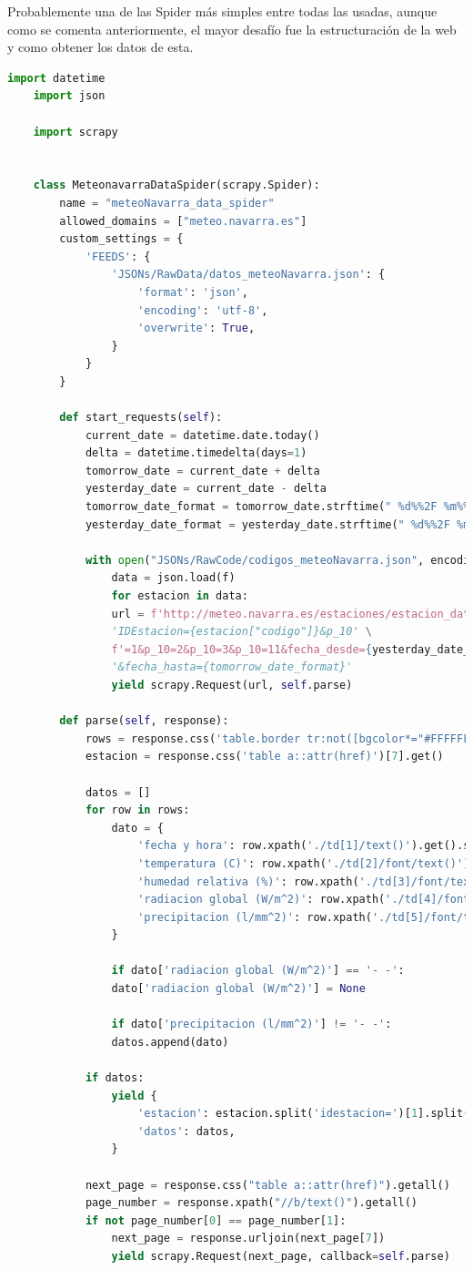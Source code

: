 Probablemente una de las Spider más simples entre todas las usadas, aunque como se comenta anteriormente, el mayor desafío fue la estructuración de la web y como obtener los datos de esta.

\begin{lstlisting}[language=Python, caption={MeteoNavarra Data Spider}]
	import datetime
	import json
	
	import scrapy
	
	
	class MeteonavarraDataSpider(scrapy.Spider):
		name = "meteoNavarra_data_spider"
		allowed_domains = ["meteo.navarra.es"]
		custom_settings = {
			'FEEDS': {
				'JSONs/RawData/datos_meteoNavarra.json': {
					'format': 'json',
					'encoding': 'utf-8',
					'overwrite': True,
				}
			}
		}
		
		def start_requests(self):
			current_date = datetime.date.today()
			delta = datetime.timedelta(days=1)
			tomorrow_date = current_date + delta
			yesterday_date = current_date - delta
			tomorrow_date_format = tomorrow_date.strftime(" %d%%2F %m%%2F%Y").replace(' 0', '')
			yesterday_date_format = yesterday_date.strftime(" %d%%2F %m%%2F%Y").replace(' 0', '')
			
			with open("JSONs/RawCode/codigos_meteoNavarra.json", encoding="utf-8") as f:
				data = json.load(f)
				for estacion in data:
				url = f'http://meteo.navarra.es/estaciones/estacion_datos_m.cfm?'
				'IDEstacion={estacion["codigo"]}&p_10' \
				f'=1&p_10=2&p_10=3&p_10=11&fecha_desde={yesterday_date_format}'
				'&fecha_hasta={tomorrow_date_format}'
				yield scrapy.Request(url, self.parse)
		
		def parse(self, response):
			rows = response.css('table.border tr:not([bgcolor*="#FFFFFF"])')
			estacion = response.css('table a::attr(href)')[7].get()
			
			datos = []
			for row in rows:
				dato = {
					'fecha y hora': row.xpath('./td[1]/text()').get().strip().replace(' ', ' ') + ':00',
					'temperatura (C)': row.xpath('./td[2]/font/text()').get(),
					'humedad relativa (%)': row.xpath('./td[3]/font/text()').get(),
					'radiacion global (W/m^2)': row.xpath('./td[4]/font/text()').get(),
					'precipitacion (l/mm^2)': row.xpath('./td[5]/font/text()').get(),
				}
				
				if dato['radiacion global (W/m^2)'] == '- -':
				dato['radiacion global (W/m^2)'] = None
				
				if dato['precipitacion (l/mm^2)'] != '- -':
				datos.append(dato)
			
			if datos:
				yield {
					'estacion': estacion.split('idestacion=')[1].split('&')[0],
					'datos': datos,
				}
			
			next_page = response.css("table a::attr(href)").getall()
			page_number = response.xpath("//b/text()").getall()
			if not page_number[0] == page_number[1]:
				next_page = response.urljoin(next_page[7])
				yield scrapy.Request(next_page, callback=self.parse)
\end{lstlisting}


